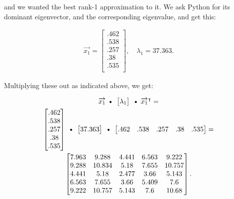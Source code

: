 \begin{alttitles}
and we wanted the best rank-1 approximation to it. We ask Python for its
dominant eigenvector, and the corresponding eigenvalue, and get this:

\vspace{-.15in}
\begin{align*}
\overrightarrow{x_1} = 
\begin{bmatrix}
.462 \\ .538 \\ .257 \\ .38 \\ .535 \\
\end{bmatrix}, \quad
\lambda_1 = 37.363.
\end{align*}
\vspace{-.15in}

Multiplying these out as indicated above, we get:

\vspace{-.15in}
\begin{gather*}
\overrightarrow{x_1} \ \textrm{\textbullet} \  \begin{bmatrix} \lambda_1
\end{bmatrix} \ \textrm{\textbullet} \  \overrightarrow{x_1}^\intercal =\\
\begin{bmatrix}
.462 \\ .538 \\ .257 \\ .38 \\ .535 \\
\end{bmatrix} \ \textrm{\textbullet}\ 
\begin{bmatrix}
37.363
\end{bmatrix} \ \textrm{\textbullet}\ 
\begin{bmatrix}
.462 & .538 & .257 & .38 & .535 \\
\end{bmatrix} = \\
\begin{bmatrix}
7.963 & 9.288 & 4.441 & 6.563 & 9.222\\
9.288 & 10.834 & 5.18 & 7.655 & 10.757\\
4.441 & 5.18 & 2.477 & 3.66 & 5.143\\
6.563 & 7.655 & 3.66 & 5.409 & 7.6 \\
9.222 & 10.757 & 5.143 & 7.6 & 10.68 \\
\end{bmatrix}.
\end{gather*}
\vspace{-.05in}


\end{alttitles}
